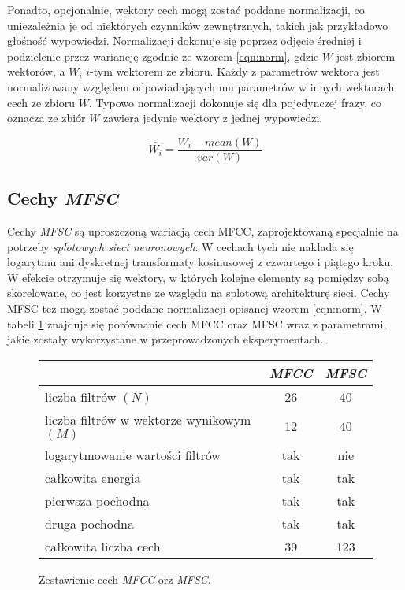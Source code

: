 \documentclass[shortabstract, mgr]{iithesis}
\begin{document}
	Ponadto, opcjonalnie, wektory cech mogą zostać poddane normalizacji, co uniezależnia je od niektórych czynników zewnętrznych, takich jak przykładowo głośność wypowiedzi. Normalizacji dokonuje się poprzez odjęcie średniej i podzielenie przez wariancję zgodnie ze wzorem \ref{eqn:norm}, gdzie $W$ jest zbiorem wektorów, a $W_i$ $i$-tym wektorem ze zbioru. Każdy z parametrów wektora jest normalizowany względem odpowiadających mu parametrów w innych wektorach cech ze zbioru $W$. Typowo normalizacji dokonuje się dla pojedynczej frazy, co oznacza ze zbiór $W$ zawiera jedynie wektory z jednej wypowiedzi.
	
	\begin{equation}
		\hat{W_i} = \frac{W_i - mean(W)}{var(W)}
		\label{eqn:norm}
	\end{equation}

	\subsection{Cechy \textit{MFSC}}
	\label{sec:Feature_vec_mfsc}
	
	Cechy \textit{MFSC} są uproszczoną wariacją cech MFCC, zaprojektowaną specjalnie na potrzeby \textit{splotowych sieci neuronowych}. W cechach tych nie nakłada się logarytmu ani dyskretnej transformaty kosinusowej z czwartego i piątego kroku. W efekcie otrzymuje się wektory, w których kolejne elementy są pomiędzy sobą skorelowane, co jest korzystne ze względu na splotową architekturę sieci. Cechy MFSC też mogą zostać poddane normalizacji opisanej wzorem \ref{eqn:norm}. W tabeli \ref{fig:feature_comparision} znajduje się porównanie cech MFCC oraz MFSC wraz z parametrami, jakie zostały wykorzystane w przeprowadzonych eksperymentach.
	
	\begin{figure}
		\begin{center}
			\begin{tabular}{|l|c|c|}
				\hline
				                                          & \textit{MFCC} & \textit{MFSC} \\ 
                \hline
				liczba filtrów $(N)$                      &       26      &      40       \\
				liczba filtrów w wektorze wynikowym $(M)$ &       12      &      40       \\  
				logarytmowanie wartości filtrów           &       tak     &      nie      \\
				całkowita energia                         &       tak     &      tak      \\
				pierwsza pochodna                         &       tak     &      tak      \\
				druga pochodna                            &       tak     &      tak      \\
				całkowita liczba cech                     &       39      &      123      \\
				\hline
				
			\end{tabular}			
		\end{center}
		\label{fig:feature_comparision}
		\caption{Zestawienie cech \textit{MFCC} orz \textit{MFSC}.}
	\end{figure}
	
\end{document}
